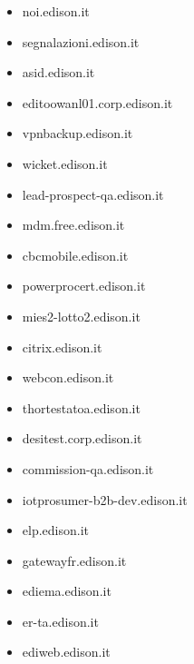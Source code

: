 \documentclass{article}
\begin{document}
\begin{itemize}
        \item noi.edison.it
    
        \item segnalazioni.edison.it
    
        \item asid.edison.it
    
        \item editoowanl01.corp.edison.it
    
        \item vpnbackup.edison.it
    
        \item wicket.edison.it
    
        \item lead-prospect-qa.edison.it
    
        \item mdm.free.edison.it
    
        \item cbcmobile.edison.it
    
        \item powerprocert.edison.it
    
        \item mies2-lotto2.edison.it
    
        \item citrix.edison.it
    
        \item webcon.edison.it
    
        \item thortestatoa.edison.it
    
        \item desitest.corp.edison.it
    
        \item commission-qa.edison.it
    
        \item iotprosumer-b2b-dev.edison.it
    
        \item elp.edison.it
    
        \item gatewayfr.edison.it
    
        \item ediema.edison.it
    
        \item er-ta.edison.it
    
        \item ediweb.edison.it
    

\end{itemize}
\end{document}
